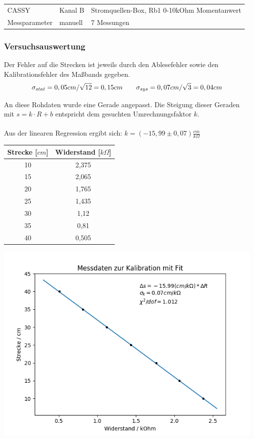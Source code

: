 \documentclass[12pt,a4paper]{article}
\begin{document}
\begin{tabular}{l l l}
	
	CASSY & Kanal B & Stromquellen-Box, Rb1 0-10kOhm Momentanwert \\ 
	
	Messparameter & manuell &  7 Messungen\\ 
	
\end{tabular} 

\subsubsection{Versuchsauswertung}
Der Fehler auf die Strecken ist jeweils durch den Ablesefehler sowie den Kalibrationsfehler des Maßbands gegeben.
\begin{equation}
\sigma _{stat} = 0,05 cm / \sqrt{12} = 0,15 cm \text{\qquad} \sigma_{sys} = 0,07 cm / \sqrt{3} = 0,04 cm
\end{equation}

An diese Rohdaten wurde eine Gerade angepasst. Die Steigung dieser Geraden mit $s=k\cdot R+b$ entspricht dem gesuchten Umrechnungsfaktor $k$.\\\\
Aus der linearen Regression ergibt sich: $ k = (-15,99 \pm 0,07) \frac{cm}{k\Omega}$
\begin{center}
	\begin{tabular}{|c|c|}
		\hline
		\textbf{Strecke [$cm$]} & \textbf{Widerstand [$k\Omega$]} \\
		\hline
		10 & 2,375 \\
		\hline
		15 & 2,065 \\
		\hline
		20 & 1,765 \\
		\hline
		25 & 1,435 \\
		\hline
		30 & 1,12 \\
		\hline
		35 & 0,81 \\
		\hline
		40 & 0,505 \\
		\hline		
	\end{tabular}
\end{center}
\begin{center}
	\includegraphics[width=0.7\linewidth]{kalibration_poti_fit}
\end{center}
\end{document}
